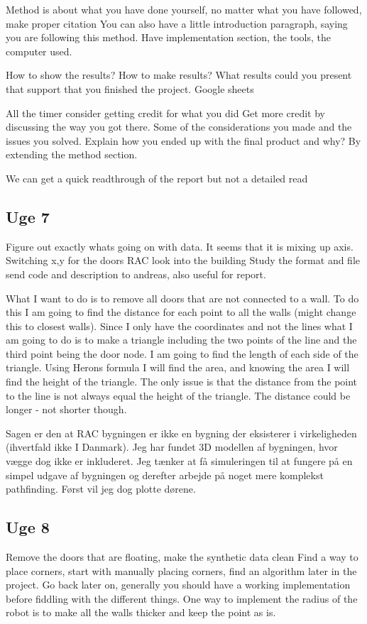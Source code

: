 Method is about what you have done yourself, no matter what you have followed, make proper citation 
You can also have a little introduction paragraph, saying you are following this method.
Have implementation section, the tools, the computer used.

How to show the results?
How to make results?
What results could you present that support that you finished the project.
Google sheets

All the timer consider getting credit for what you did
Get more credit by discussing the way you got there. Some of the considerations you made and the issues you solved.
Explain how you ended up with the final product and why?
By extending the method section.

We can get a quick readthrough of the report but not a detailed read


\subsection{Uge 7}
Figure out exactly whats going on with data.
It seems that it is mixing up axis.
Switching x,y for the doors
RAC look into the building 
Study the format and file
send code and description to andreas, also useful for report.

What I want to do is to remove all doors that are not connected to a wall. To do this I am going to find the distance for each point to all the walls (might change this to closest walls). Since I only have the coordinates and not the lines what I am going to do is to make a triangle including the two points of the line and the third point being the door node. I am going to find the length of each side of the triangle. Using Herons formula I will find the area, and knowing the area I will find the height of the triangle. The only issue is that the distance from the point to the line is not always equal the height of the triangle. The distance could be longer - not shorter though.

Sagen er den at RAC bygningen er ikke en bygning der eksisterer i virkeligheden (ihvertfald ikke I Danmark). Jeg har fundet 3D modellen af bygningen, hvor vægge dog ikke er inkluderet. Jeg tænker at få simuleringen til at fungere på en simpel udgave af bygningen og derefter arbejde på noget mere komplekst pathfinding. Først vil jeg dog plotte dørene.

\subsection{Uge 8}
Remove the doors that are floating, make the synthetic data clean
Find a way to place corners, start with manually placing corners, find an algorithm later in the project.
Go back later on, generally you should have a working implementation before fiddling with the  different things.
One way to implement the radius of the robot is to make all the walls thicker and keep the point as is.

